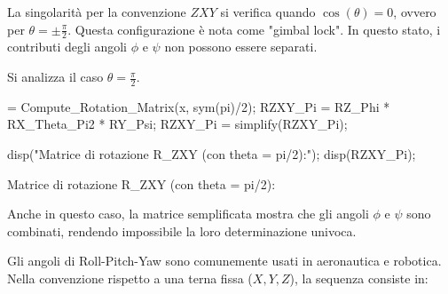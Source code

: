\documentclass[11pt, a4paper]{article}
\begin{document}

\begin{par}
\begin{flushleft}
La singolarità per la convenzione $ZXY$ si verifica quando $\cos(\theta )=0$, ovvero per $\theta =\pm \frac{\pi }{2}$. Questa configurazione è nota come "gimbal lock". In questo stato, i contributi degli angoli $\phi$ e $\psi$ non possono essere separati.
\end{flushleft}
\end{par}

\begin{par}
\begin{flushleft}
Si analizza il caso $\theta =\frac{\pi }{2}$.
\end{flushleft}
\end{par}

\begin{matlabcode}
[RX_Theta_Pi2] = Compute_Rotation_Matrix(x, sym(pi)/2);
RZXY_Pi = RZ_Phi * RX_Theta_Pi2 * RY_Psi;
RZXY_Pi = simplify(RZXY_Pi);

disp("Matrice di rotazione R_ZXY (con theta = pi/2):");
disp(RZXY_Pi);
\end{matlabcode}
\begin{matlaboutput}
Matrice di rotazione R_ZXY (con theta = pi/2):
\end{matlaboutput}

\begin{par}
\begin{flushleft}
Anche in questo caso, la matrice semplificata mostra che gli angoli $\phi$ e $\psi$ sono combinati, rendendo impossibile la loro determinazione univoca.
\end{flushleft}
\end{par}


\begin{par}
\begin{flushleft}
Gli angoli di Roll-Pitch-Yaw sono comunemente usati in aeronautica e robotica. Nella convenzione rispetto a una terna fissa ($X, Y, Z$), la sequenza consiste in:
\end{flushleft}
\end{par}
\end{document}
